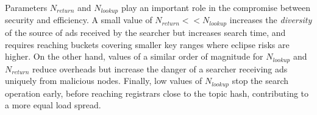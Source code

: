 Parameters $N_\textit{return}$ and $N_\textit{lookup}$ play an important role in the compromise between security and efficiency.
A small value of $N_\textit{return} << N_\textit{lookup}$ increases the \emph{diversity} of the source of ads received by the searcher but increases search time, and requires reaching buckets covering smaller key ranges where eclipse risks are higher.
On the other hand, values of a similar order of magnitude for $N_\textit{lookup}$ and $N_\textit{return}$ reduce overheads but increase the danger of a searcher receiving ads uniquely from malicious nodes.
Finally, low values of $N_\textit{lookup}$ stop the search operation early, before reaching registrars close to the topic hash, contributing to a more equal load spread.






